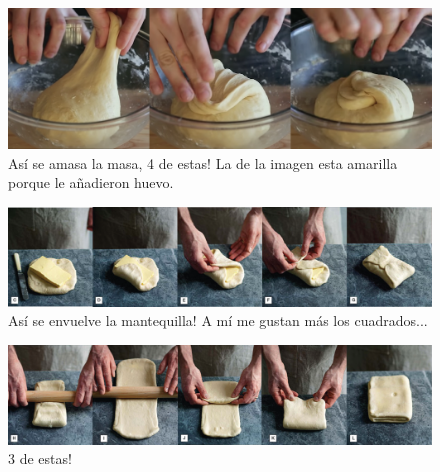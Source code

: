 \begin{figure}
\centering
\includegraphics[width=1\textwidth]{recetas/croissants/figures/amasado-croissant.png}
\caption{Así se amasa la masa, 4 de estas! La de la imagen esta amarilla porque le añadieron huevo.}
\label{fig:amasado-croissant}
\end{figure}


\begin{figure}
\centering
\includegraphics[width=1\textwidth]{recetas/croissants/figures/envoltura-croissant.png}
\caption{Así se envuelve la mantequilla! A mí me gustan más los cuadrados...}
\label{fig:envoltura-croissant}
\end{figure}

\begin{figure}
\centering
\includegraphics[width=1\textwidth]{recetas/croissants/figures/doblado-croissant.png}
\caption{3 de estas!}
\label{fig:doblado-croissant}
\end{figure}
